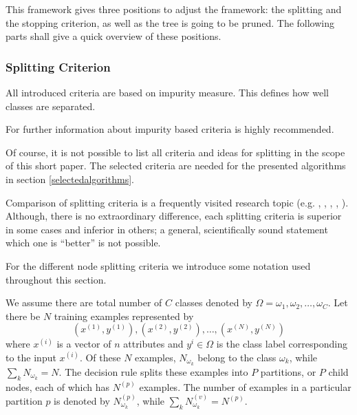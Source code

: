 This framework gives three positions to adjust the framework: the splitting and the stopping criterion, as well as the tree is going to be pruned. The following parts shall give a quick overview of these positions. 

\newpage

\subsubsection{Splitting Criterion}

All introduced criteria are based on impurity measure. This defines how well classes are separated. 

\begin{remark}
 For further information about impurity based criteria \cite[p. 53 ff.]{rokach2008data} is highly recommended.
\end{remark}

Of course, it is not possible to list all criteria and ideas for splitting in the scope of this short paper. The selected criteria are needed for the presented algorithms in section \ref{selectedalgorithms}. 

Comparison of splitting criteria is a frequently visited research topic (e.g. \cite{breiman1996technical}, \cite{buntine1992further}, \cite{mingers1989empirical}, \cite{drummond2000exploiting}, \cite{shih1999families}). Although, there is no extraordinary difference, each splitting criteria is superior in some cases and inferior in others; a general, scientifically sound statement which one is ``better'' is not possible. 

For the different node splitting criteria we introduce some notation used throughout this section.

We assume there are total number of $C$ classes denoted by $\Omega = {\omega_1, \omega_2, \dots, \omega_C}$. Let there be $N$ training examples represented by
\begin{equation}
    \left(x^{(1)}, y^{(1)} \right), \left(x^{(2)}, y^{(2)} \right), \dots, \left(x^{(N)}, y^{(N)} \right)
\end{equation}
where $x^{(i)}$ is a vector of $n$ attributes and $y^{i} \in \Omega$ is the class label corresponding to the input $x^{(i)}$. Of these $N$ examples, $N_{\omega_k}$ belong to the class $\omega_k$, while $\sum_k N_{\omega_k} = N$. The decision rule splits these examples into $P$ partitions, or $P$ child nodes, each of which has $N^(p)$ examples. The number of examples in a particular partition $p$ is denoted by $N^{(p)}_{\omega_k}$, while $\sum_k N^{(v)}_{\omega_k} = N^{(p)}$.


